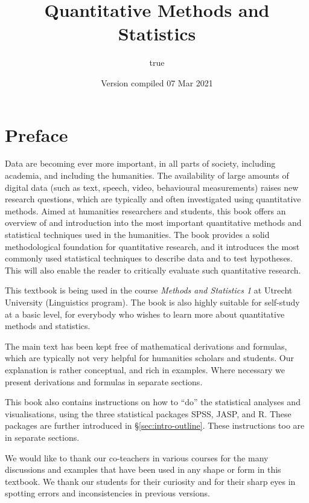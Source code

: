 \documentclass[
]{book}
\title{Quantitative Methods and Statistics}
\author{true}
\date{Version compiled 07 Mar 2021}
\begin{document}
\maketitle

{
\setcounter{tocdepth}{1}
\tableofcontents
}
\hypertarget{preface}{%
\chapter*{Preface}\label{preface}}

Data are becoming ever more important, in all parts of society, including academia, and including the humanities. The availability of large amounts of digital data (such as text, speech, video, behavioural measurements) raises new research questions, which are typically and often investigated using quantitative methods.
Aimed at humanities researchers and students, this book offers an overview of and introduction into the most important quantitative methods and statistical techniques used in the humanities. The book provides a solid methodological foundation for quantitative research, and it introduces the most commonly used statistical techniques to describe data and to test hypotheses. This will also enable the reader to critically evaluate such quantitative research.

This textbook is being used in the course \emph{Methods and Statistics 1} at Utrecht University (Linguistics program). The book is also highly suitable for self-study at a basic level, for everybody who wishes to learn more about quantitative methods and statistics.

The main text has been kept free of mathematical derivations and formulas, which are typically not very helpful for humanities scholars and students. Our explanation is rather conceptual, and rich in examples. Where necessary we present derivations and formulas in separate sections.

This book also contains instructions on how to ``do'' the statistical analyses and visualisations, using the three statistical packages SPSS, JASP, and R. These packages are further introduced in §\ref{sec:intro-outline}. These instructions too are in separate sections.

We would like to thank our co-teachers in various courses for the many discussions and examples that have been used in any shape or form in this textbook. We thank our students for their curiosity and for their sharp eyes in spotting errors and inconsistencies in previous versions.
\end{document}
